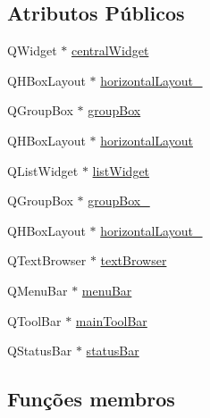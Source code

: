 \subsection*{Atributos Públicos}
\begin{DoxyCompactItemize}
\item 
Q\+Widget $\ast$ \mbox{\hyperlink{class_ui___main_window_a30075506c2116c3ed4ff25e07ae75f81}{central\+Widget}}
\item 
Q\+H\+Box\+Layout $\ast$ \mbox{\hyperlink{class_ui___main_window_a03ce63974cc69b067c91bbf285cceca8}{horizontal\+Layout\+\_}}
\item 
Q\+Group\+Box $\ast$ \mbox{\hyperlink{class_ui___main_window_aef7cb3be8cecfc9aaf98f036a98781ce}{group\+Box}}
\item 
Q\+H\+Box\+Layout $\ast$ \mbox{\hyperlink{class_ui___main_window_acd6fdc9ebacc4b25b834162380d75ce8}{horizontal\+Layout}}
\item 
Q\+List\+Widget $\ast$ \mbox{\hyperlink{class_ui___main_window_ae647a15635ba8a0e5d5aec475db99d8f}{list\+Widget}}
\item 
Q\+Group\+Box $\ast$ \mbox{\hyperlink{class_ui___main_window_abb28acde35ffce4d0e6152579df2cbc3}{group\+Box\+\_}}
\item 
Q\+H\+Box\+Layout $\ast$ \mbox{\hyperlink{class_ui___main_window_a80867018070156432923d0266cc9fe25}{horizontal\+Layout\+\_}}
\item 
Q\+Text\+Browser $\ast$ \mbox{\hyperlink{class_ui___main_window_a2c789c07fa5fc1cee05aae8df52bb02d}{text\+Browser}}
\item 
Q\+Menu\+Bar $\ast$ \mbox{\hyperlink{class_ui___main_window_a2be1c24ec9adfca18e1dcc951931457f}{menu\+Bar}}
\item 
Q\+Tool\+Bar $\ast$ \mbox{\hyperlink{class_ui___main_window_a5172877001c8c7b4e0f6de50421867d1}{main\+Tool\+Bar}}
\item 
Q\+Status\+Bar $\ast$ \mbox{\hyperlink{class_ui___main_window_a50fa481337604bcc8bf68de18ab16ecd}{status\+Bar}}
\end{DoxyCompactItemize}


\subsection{Funções membros}
\mbox{\label{class_ui___main_window_a097dd160c3534a204904cb374412c618}} 
